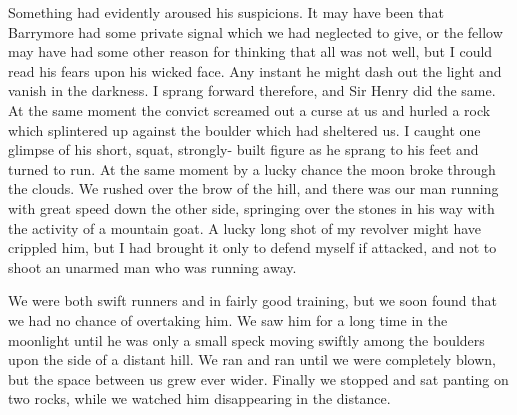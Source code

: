 \documentclass[paper=5.5in:8.5in,BCOR=7mm,twoside,DIV=calc,12pt,usegeometry,openany,chapterprefix,endperiod]{scrbook} %
\begin{document}
Something had evidently aroused his suspicions. It may have been that Barrymore had some private signal which we had neglected to give, or the fellow may have had some other reason for thinking that all was not well, but I could read his fears upon his wicked face. Any instant he might dash out the light and vanish in the darkness. I sprang forward therefore, and Sir Henry did the same. At the same moment the convict screamed out a curse at us and hurled a rock which splintered up against the boulder which had sheltered us. I caught one glimpse of his short, squat, strongly- built figure as he sprang to his feet and turned to run. At the same moment by a lucky chance the moon broke through the clouds. We rushed over the brow of the hill, and there was our man running with great speed down the other side, springing over the stones in his way with the activity of a mountain goat. A lucky long shot of my revolver might have crippled him, but I had brought it only to defend myself if attacked, and not to shoot an unarmed man who was running away.

We were both swift runners and in fairly good training, but we soon found that we had no chance of overtaking him. We saw him for a long time in the moonlight until he was only a small speck moving swiftly among the boulders upon the side of a distant hill. We ran and ran until we were completely blown, but the space between us grew ever wider. Finally we stopped and sat panting on two rocks, while we watched him disappearing in the distance.
\end{document}
